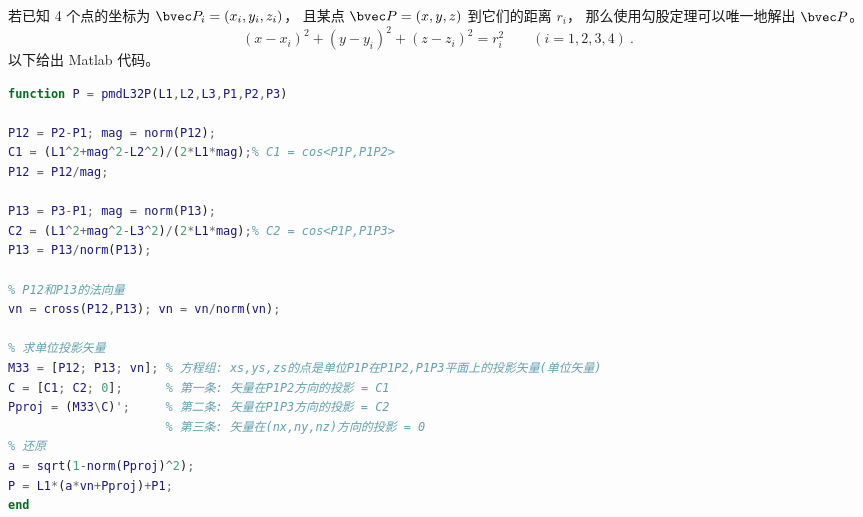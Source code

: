 
\begin{issues}
\issueDraft
\end{issues}

若已知 4 个点的坐标为 $\bvec P_i = (x_i,y_i,z_i)$， 且某点 $\bvec P = (x,y,z)$ 到它们的距离 $r_i$， 那么使用勾股定理可以唯一地解出 $\bvec P$。
\begin{equation}
(x-x_i)^2 + (y-y_i)^2 + (z-z_i)^2 = r_i^2 \qquad (i = 1,2,3,4)~.
\end{equation}
以下给出 Matlab 代码。

\begin{lstlisting}[language=matlab, caption=pmdL32P.m]
% 已知三棱锥底面的三个点坐标 P1,P2,P3, 和三条棱 L1,L2,L3, 求顶点坐标
function P = pmdL32P(L1,L2,L3,P1,P2,P3)

P12 = P2-P1; mag = norm(P12);
C1 = (L1^2+mag^2-L2^2)/(2*L1*mag);% C1 = cos<P1P,P1P2>
P12 = P12/mag;

P13 = P3-P1; mag = norm(P13);
C2 = (L1^2+mag^2-L3^2)/(2*L1*mag);% C2 = cos<P1P,P1P3>
P13 = P13/norm(P13);

% P12和P13的法向量
vn = cross(P12,P13); vn = vn/norm(vn);

% 求单位投影矢量
M33 = [P12; P13; vn]; % 方程组: xs,ys,zs的点是单位P1P在P1P2,P1P3平面上的投影矢量(单位矢量)
C = [C1; C2; 0];      % 第一条: 矢量在P1P2方向的投影 = C1
Pproj = (M33\C)';     % 第二条: 矢量在P1P3方向的投影 = C2
                      % 第三条: 矢量在(nx,ny,nz)方向的投影 = 0
% 还原
a = sqrt(1-norm(Pproj)^2);
P = L1*(a*vn+Pproj)+P1;
end
\end{lstlisting}

